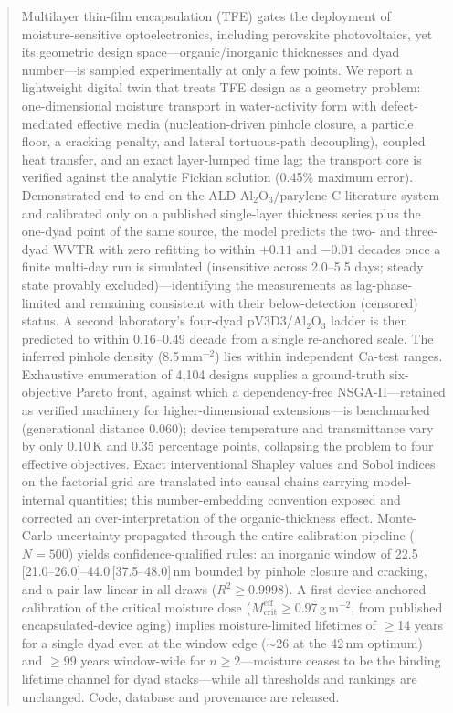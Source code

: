 \documentclass[11pt]{article}
\begin{document}
\begin{abstract}
Multilayer thin-film encapsulation (TFE) gates the deployment of moisture-sensitive optoelectronics, including perovskite photovoltaics, yet its geometric design space---organic/inorganic thicknesses and dyad number---is sampled experimentally at only a few points. We report a lightweight digital twin that treats TFE design as a geometry problem: one-dimensional moisture transport in water-activity form with defect-mediated effective media (nucleation-driven pinhole closure, a particle floor, a cracking penalty, and lateral tortuous-path decoupling), coupled heat transfer, and an exact layer-lumped time lag; the transport core is verified against the analytic Fickian solution (0.45\% maximum error). Demonstrated end-to-end on the ALD-Al$_2$O$_3$/parylene-C literature system and calibrated only on a published single-layer thickness series plus the one-dyad point of the same source, the model predicts the two- and three-dyad WVTR with zero refitting to within $+0.11$ and $-0.01$ decades once a finite multi-day run is simulated (insensitive across 2.0--5.5 days; steady state provably excluded)---identifying the measurements as lag-phase-limited and remaining consistent with their below-detection (censored) status. A second laboratory's four-dyad pV3D3/Al$_2$O$_3$ ladder is then predicted to within $0.16$--$0.49$ decade from a single re-anchored scale. The inferred pinhole density (8.5\,mm$^{-2}$) lies within independent Ca-test ranges. Exhaustive enumeration of 4{,}104 designs supplies a ground-truth six-objective Pareto front, against which a dependency-free NSGA-II---retained as verified machinery for higher-dimensional extensions---is benchmarked (generational distance 0.060); device temperature and transmittance vary by only 0.10\,K and 0.35 percentage points, collapsing the problem to four effective objectives. Exact interventional Shapley values and Sobol indices on the factorial grid are translated into causal chains carrying model-internal quantities; this number-embedding convention exposed and corrected an over-interpretation of the organic-thickness effect. Monte-Carlo uncertainty propagated through the entire calibration pipeline ($N{=}500$) yields confidence-qualified rules: an inorganic window of 22.5\,[21.0--26.0]--44.0\,[37.5--48.0]\,nm bounded by pinhole closure and cracking, and a pair law linear in all draws ($R^2\ge0.9998$). A first device-anchored calibration of the critical moisture dose ($M_{\mathrm{crit}}^{\mathrm{eff}}\ge0.97$\,g\,m$^{-2}$, from published encapsulated-device aging) implies moisture-limited lifetimes of $\ge$14 years for a single dyad even at the window edge ($\sim$26 at the 42\,nm optimum) and $\ge$99 years window-wide for $n\ge2$---moisture ceases to be the binding lifetime channel for dyad stacks---while all thresholds and rankings are unchanged. Code, database and provenance are released.
\end{abstract}
\end{document}
